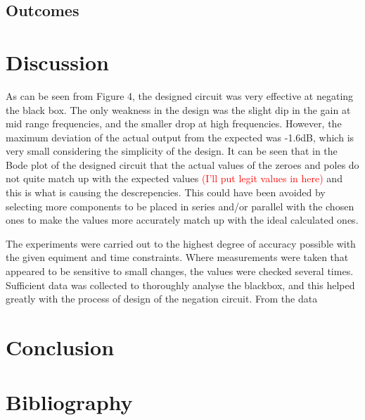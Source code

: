 \documentclass[12pt]{article} %
\begin{document}
\subsection{Outcomes}
\pagebreak





\section{Discussion}

As can be seen from Figure 4, the designed circuit was very effective at negating the black box. The only weakness in the design was the slight dip in the gain at mid range frequencies, and the smaller drop at high frequencies. However, the maximum deviation of the actual output from the expected was -1.6dB, which is very small considering the simplicity of the design. It can be seen that in the Bode plot of the designed circuit that the actual values of the zeroes and poles do not quite match up with the expected values \textcolor{red}{(I'll put legit values in here)} and this is what is causing the descrepencies. This could have been avoided by selecting more components to be placed in series and/or parallel with the chosen ones to make the values more accurately match up with the ideal calculated ones.

The experiments were carried out to the highest degree of accuracy possible with the given equiment and time constraints. Where measurements were taken that appeared to be sensitive to small changes, the values were checked several times. Sufficient data was collected to thoroughly analyse the blackbox, and this helped greatly with the process of design of the negation circuit. From the data

\pagebreak





\section{Conclusion}
\pagebreak




\section{Bibliography}


\pagebreak
\end{document}
